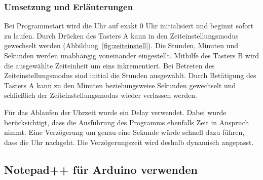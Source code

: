 \subsubsection{Umsetzung und Erläuterungen}
Bei Programmstart wird die Uhr auf exakt 0 Uhr initialisiert und beginnt sofort zu laufen. Durch Drücken des Tasters A kann in den Zeiteinstellungsmodus gewechselt werden  (Abbildung~\ref{fig:zeiteinstell}). Die Stunden, Minuten und Sekunden werden unabhängig voneinander eingestellt. Mithilfe des Tasters B wird die ausgewählte Zeiteinheit um eins inkrementiert. Bei Betreten des Zeiteinstellungsmodus sind initial die Stunden ausgewählt. Durch Betätigung des Tasters A kann zu den Minuten beziehungsweise Sekunden gewechselt und schließlich der Zeiteinstellungsmodus wieder verlassen werden.

Für das Ablaufen der Uhrzeit wurde ein Delay verwendet. Dabei wurde berücksichtigt, dass die Ausführung des Programms ebenfalls Zeit in Anspruch nimmt. Eine Verzögerung um genau eine Sekunde würde schnell dazu führen, dass die Uhr nachgeht. Die Verzögerungszeit wird deshalb dynamisch angepasst.

\subsection{Notepad++ für Arduino verwenden}

